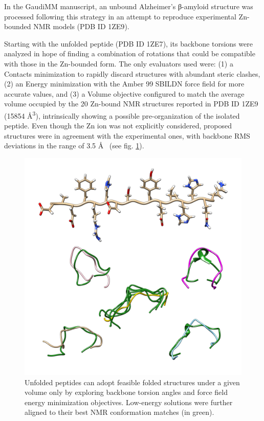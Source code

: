 In the GaudiMM manuscript, an unbound Alzheimer's β-amyloid structure was processed following this strategy in an attempt to reproduce experimental Zn-bounded NMR models (PDB ID 1ZE9\cite{pdb:1ze9}).

Starting with the unfolded peptide (PDB ID 1ZE7\cite{pdb:1ze7}), its backbone torsions were analyzed in hope of finding a combination of rotations that could be compatible with those in the Zn-bounded form. The only evaluators used were: (1) a Contacts minimization to rapidly discard structures with abundant steric clashes, (2) an Energy minimization with the Amber 99 SBILDN force field for more accurate values, and (3) a Volume objective configured to match the average volume occupied by the 20 Zn-bound NMR structures reported in PDB ID 1ZE9 (15854 Å\textsuperscript{3}), intrinsically showing a possible pre-organization of the isolated peptide. Even though the Zn ion was not explicitly considered, proposed structures were in agreement with the experimental ones, with backbone RMS deviations in the range of 3.5 \AA ~ (see fig. \ref{fig:peptide-folding}).


\begin{figure}
	\begin{Center}
		\includegraphics[width=\textwidth]{./figures/06/peptide-folding.png}
	\end{Center}
	\caption[Peptide folding]{Unfolded peptides can adopt feasible folded structures under a given volume only by exploring backbone torsion angles and force field energy minimization objectives. Low-energy solutions were further aligned to their best NMR conformation matches (in green).}
	\label{fig:peptide-folding}
\end{figure}


